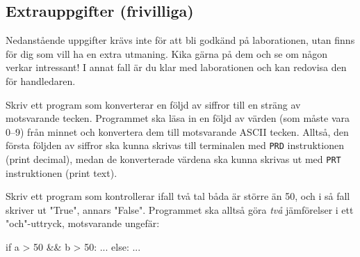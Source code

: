 \subsection{Extrauppgifter (frivilliga)}

Nedanstående uppgifter krävs inte för att bli godkänd på laborationen, utan finns för dig som vill ha en extra utmaning. Kika gärna på dem och se om någon verkar intressant! I annat fall är du klar med laborationen och kan redovisa den för handledaren.

\begin{Extrauppgifter}
    \item Skriv ett program som konverterar en följd av siffror till en sträng av motsvarande tecken. Programmet ska läsa in en följd av värden (som måste vara 0--9) från minnet och konvertera dem till motsvarande ASCII tecken. Alltså, den första följden av siffror ska kunna skrivas till terminalen med \texttt{PRD} instruktionen (print decimal), medan de konverterade värdena ska kunna skrivas ut med \texttt{PRT} instruktionen (print text).

    \item Skriv ett program som kontrollerar ifall två tal båda är större än 50, och i så fall skriver ut "True", annars "False". Programmet ska alltså göra \emph{två} jämförelser i ett "och"-uttryck, motsvarande ungefär:
    \begin{Code}
        if a > 50 && b > 50:
            ...
        else:
            ...
    \end{Code}
    \vspace{-3mm}


\end{Extrauppgifter}
